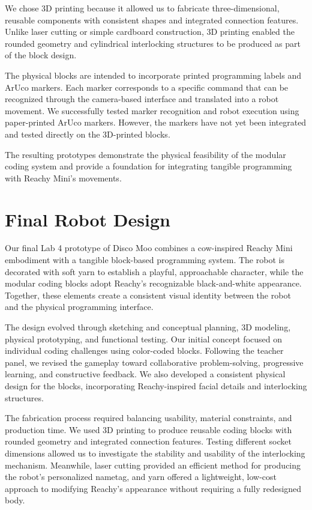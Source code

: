 \documentclass[conference]{IEEEtran}
\begin{document}
We chose 3D printing because it allowed us to fabricate three-dimensional, reusable components with consistent shapes and integrated connection features. Unlike laser cutting or simple cardboard construction, 3D printing enabled the rounded geometry and cylindrical interlocking structures to be produced as part of the block design.

The physical blocks are intended to incorporate printed programming labels and ArUco markers. Each marker corresponds to a specific command that can be recognized through the camera-based interface and translated into a robot movement. We successfully tested marker recognition and robot execution using paper-printed ArUco markers. However, the markers have not yet been integrated and tested directly on the 3D-printed blocks.

The resulting prototypes demonstrate the physical feasibility of the modular coding system and provide a foundation for integrating tangible programming with Reachy Mini's movements.





\section{Final Robot Design}

Our final Lab 4 prototype of Disco Moo combines a cow-inspired Reachy Mini embodiment with a tangible block-based programming system. The robot is decorated with soft yarn to establish a playful, approachable character, while the modular coding blocks adopt Reachy's recognizable black-and-white appearance. Together, these elements create a consistent visual identity between the robot and the physical programming interface.

The design evolved through sketching and conceptual planning, 3D modeling, physical prototyping, and functional testing. Our initial concept focused on individual coding challenges using color-coded blocks. Following the teacher panel, we revised the gameplay toward collaborative problem-solving, progressive learning, and constructive feedback. We also developed a consistent physical design for the blocks, incorporating Reachy-inspired facial details and interlocking structures.

The fabrication process required balancing usability, material constraints, and production time. We used 3D printing to produce reusable coding blocks with rounded geometry and integrated connection features. Testing different socket dimensions allowed us to investigate the stability and usability of the interlocking mechanism. Meanwhile, laser cutting provided an efficient method for producing the robot's personalized nametag, and yarn offered a lightweight, low-cost approach to modifying Reachy's appearance without requiring a fully redesigned body.
\end{document}
